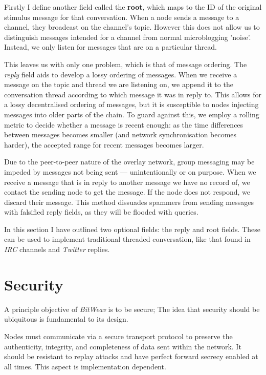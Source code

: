 \documentclass[10pt,a4paper,onecolumn]{article}
\begin{document}
Firstly I define another field called the \textbf{root}, which maps to the ID of the original stimulus message for that conversation. When a node sends a message to a channel, they broadcast on the channel's topic. However this does not allow us to distinguish messages intended for a channel from normal microblogging 'noise'. Instead, we only listen for messages that are on a particular thread. 

This leaves us with only one problem, which is that of message ordering. The \emph{reply} field aids to develop a lossy ordering of messages. When we receive a message on the topic and thread we are listening on, we append it to the conversation thread according to which message it was in reply to. This allows for a lossy decentralised ordering of messages, but it is susceptible to nodes injecting messages into older parts of the chain. To guard against this, we employ a rolling metric to decide whether a message is recent enough: as the time differences between messages becomes smaller (and network synchronisation becomes harder), the accepted range for recent messages becomes larger. 

Due to the peer-to-peer nature of the overlay network, group messaging may be impeded by messages not being sent — unintentionally or on purpose. When we receive a message that is in reply to another message we have no record of, we contact the sending node to get the message. If the node does not respond, we discard their message. This method dissuades spammers from sending messages with falsified reply fields, as they will be flooded with queries. 

In this section I have outlined two optional fields: the reply and root fields. These  can be used to implement traditional threaded conversation, like that found in \textit{IRC} channels and \textit{Twitter} replies.

\section{Security}
\label{security}
A principle objective of \textit{BitWeav} is to be secure; The idea that security should be ubiquitous is fundamental to its design.

Nodes must communicate via a secure transport protocol to preserve the authenticity, integrity, and completeness of data sent within the network. It should be resistant to replay attacks and have perfect forward secrecy enabled at all times. This aspect is implementation dependent.
\end{document}
